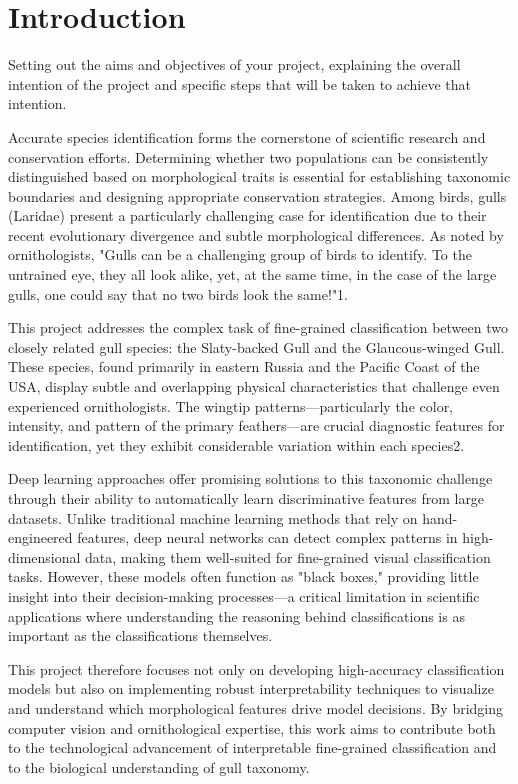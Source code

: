 \chapter{Introduction}

Setting out the aims and objectives of your project, explaining the overall intention of the project and specific steps that will be taken to achieve that intention.



Accurate species identification forms the cornerstone of scientific research and conservation efforts. Determining whether two populations can be consistently distinguished based on morphological traits is essential for establishing taxonomic boundaries and designing appropriate conservation strategies. Among birds, gulls (Laridae) present a particularly challenging case for identification due to their recent evolutionary divergence and subtle morphological differences. As noted by ornithologists, "Gulls can be a challenging group of birds to identify. To the untrained eye, they all look alike, yet, at the same time, in the case of the large gulls, one could say that no two birds look the same!"1.

This project addresses the complex task of fine-grained classification between two closely related gull species: the Slaty-backed Gull and the Glaucous-winged Gull. These species, found primarily in eastern Russia and the Pacific Coast of the USA, display subtle and overlapping physical characteristics that challenge even experienced ornithologists. The wingtip patterns—particularly the color, intensity, and pattern of the primary feathers—are crucial diagnostic features for identification, yet they exhibit considerable variation within each species2.

Deep learning approaches offer promising solutions to this taxonomic challenge through their ability to automatically learn discriminative features from large datasets. Unlike traditional machine learning methods that rely on hand-engineered features, deep neural networks can detect complex patterns in high-dimensional data, making them well-suited for fine-grained visual classification tasks. However, these models often function as "black boxes," providing little insight into their decision-making processes—a critical limitation in scientific applications where understanding the reasoning behind classifications is as important as the classifications themselves.

This project therefore focuses not only on developing high-accuracy classification models but also on implementing robust interpretability techniques to visualize and understand which morphological features drive model decisions. By bridging computer vision and ornithological expertise, this work aims to contribute both to the technological advancement of interpretable fine-grained classification and to the biological understanding of gull taxonomy.



